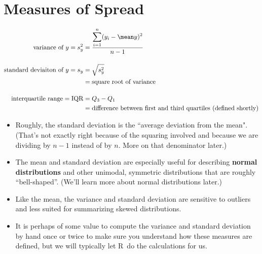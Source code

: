 \documentclass[twoside]{book}\usepackage[]{graphicx}\usepackage[]{xcolor}
\def\R{{\sf R}}
\def\term#1{\textbf{#1}}
\begin{document}

\section{Measures of Spread}

\begin{align*}
\mbox{variance of $y$} 
= s^2_y 
&= 
\frac{\displaystyle \sum_{i = 1}^{n} (y_i - \mean y)^2 }{n-1}
\\[4mm]
\mbox{standard deviaiton of $y$} = s_y 
&= \sqrt{s^2_y} 
\\
&= \mbox{square root of variance}
\\[4mm]
\mbox{interquartile range} = \mbox{IQR}
&= Q_3 - Q_1 
\\
& = \mbox{difference between first and third quartiles (defined shortly)}
\end{align*}

\begin{itemize}
\item
Roughly, the standard deviation is the ``average deviation from the mean".  (That's not
exactly right because of the squaring involved and because we are dividing
by $n-1$ instead of by $n$.  More on that denominator later.)  
\item
The mean and standard deviation are especially useful for describing 
\term{normal distributions} and other unimodal, symmetric distributions that
are roughly ``bell-shaped''.  (We'll learn more about normal distributions later.)
\item
Like the mean, the variance and standard deviation are 
sensitive to outliers and less suited for summarizing skewed distributions.
\item
It is perhaps of some value to compute the variance and standard deviation by hand
once or twice to make sure you understand how these measures are defined, but we will
typically let \R\ do the calculations for us.
\end{itemize}
\end{document}

